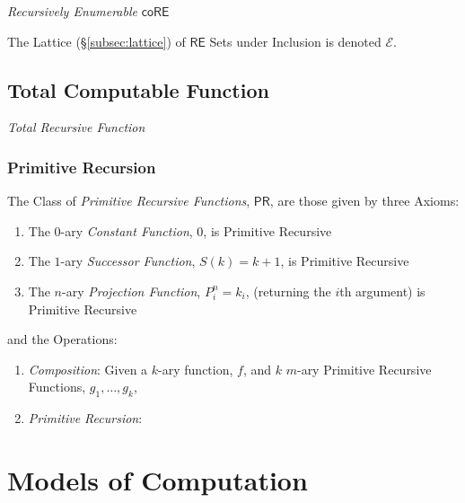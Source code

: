 \documentclass{article}
\begin{document}
\emph{Recursively Enumerable} $\mathsf{coRE}$

The Lattice (\S\ref{subsec:lattice}) of $\mathsf{RE}$ Sets under
Inclusion is denoted $\mathcal{E}$.

\subsection{Total Computable Function}\label{subsec:recursive_function}

\emph{Total Recursive Function}

\subsubsection{Primitive Recursion}\label{subsec:primitive_recursion}

The Class of \emph{Primitive Recursive Functions}, $\mathsf{PR}$, are
those given by three Axioms:
\begin{enumerate}
    \item The $0$-ary \emph{Constant Function}, $0$, is Primitive
      Recursive
    \item The $1$-ary \emph{Successor Function}, $S(k) = k + 1$, is
      Primitive Recursive
    \item The $n$-ary \emph{Projection Function}, $P_i^n = k_i$,
      (returning the $i$th argument) is Primitive Recursive
\end{enumerate}
and the Operations:
\begin{enumerate}
    \item \emph{Composition}: Given a $k$-ary function, $f$, and $k$
      $m$-ary Primitive Recursive Functions, $g_1, \ldots, g_k$,
    \item \emph{Primitive Recursion}:
\end{enumerate}



\section{Models of Computation}\label{sec:computation_model}
\end{document}
